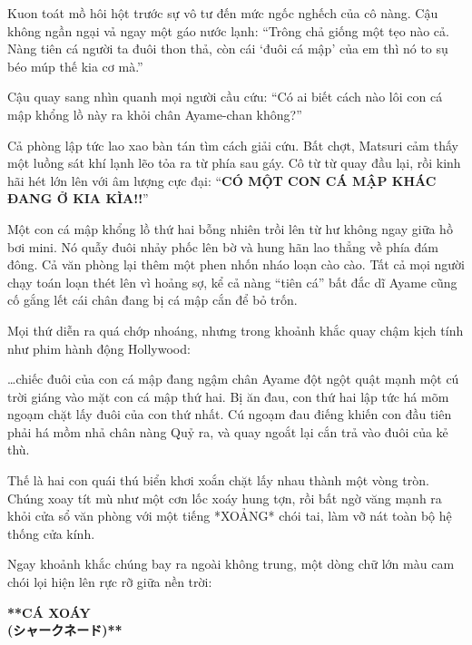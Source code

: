 \documentclass[../main.tex]{subfiles}
\begin{document}

Kuon toát mồ hôi hột trước sự vô tư đến mức ngốc nghếch của cô nàng. Cậu không ngần ngại vả ngay một gáo nước lạnh:
``Trông chả giống một tẹo nào cả. Nàng tiên cá người ta đuôi thon thả, còn cái `đuôi cá mập' của em thì nó to sụ béo múp thế kia cơ mà.''

Cậu quay sang nhìn quanh mọi người cầu cứu:
``Có ai biết cách nào lôi con cá mập khổng lồ này ra khỏi chân Ayame-chan không?''

Cả phòng lập tức lao xao bàn tán tìm cách giải cứu. Bất chợt, Matsuri cảm thấy một luồng sát khí lạnh lẽo tỏa ra từ phía sau gáy. Cô từ từ quay đầu lại, rồi kinh hãi hét lớn lên với âm lượng cực đại:
``\textbf{CÓ MỘT CON CÁ MẬP KHÁC ĐANG Ở KIA KÌA!!}''

Một con cá mập khổng lồ thứ hai bỗng nhiên trồi lên từ hư không ngay giữa hồ bơi mini. Nó quẫy đuôi nhảy phốc lên bờ và hung hãn lao thẳng về phía đám đông. Cả văn phòng lại thêm một phen nhốn nháo loạn cào cào. Tất cả mọi người chạy toán loạn thét lên vì hoảng sợ, kể cả nàng ``tiên cá'' bất đắc dĩ Ayame cũng cố gắng lết cái chân đang bị cá mập cắn để bỏ trốn.

Mọi thứ diễn ra quá chớp nhoáng, nhưng trong khoảnh khắc quay chậm kịch tính như phim hành động Hollywood:


\dots chiếc đuôi của con cá mập đang ngậm chân Ayame đột ngột quật mạnh một cú trời giáng vào mặt con cá mập thứ hai. Bị ăn đau, con thứ hai lập tức há mõm ngoạm chặt lấy đuôi của con thứ nhất. Cú ngoạm đau điếng khiến con đầu tiên phải há mồm nhả chân nàng Quỷ ra, và quay ngoắt lại cắn trả vào đuôi của kẻ thù.


Thế là hai con quái thú biển khơi xoắn chặt lấy nhau thành một vòng tròn. Chúng xoay tít mù như một cơn lốc xoáy hung tợn, rồi bất ngờ văng mạnh ra khỏi cửa sổ văn phòng với một tiếng *XOẢNG* chói tai, làm vỡ nát toàn bộ hệ thống cửa kính.

Ngay khoảnh khắc chúng bay ra ngoài không trung, một dòng chữ lớn màu cam chói lọi hiện lên rực rỡ giữa nền trời:

\begin{center}
  \textbf{{\color{orange}**CÁ XOÁY\\(シャークネード)**}}
\end{center}

\omk
\end{document}
